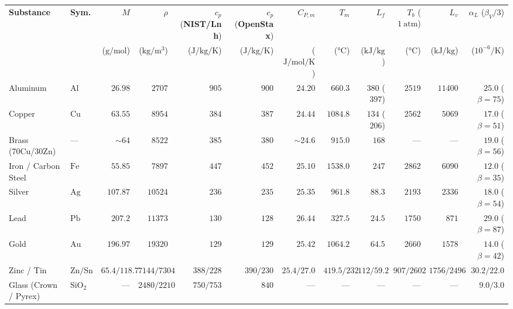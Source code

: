 \documentclass[10pt,twoside,openany,letterpaper]{book}
\begin{document}
\begin{quicksheet}
\begin{formulacard}
\par\smallskip\noindent
\scriptsize\setlength{\tabcolsep}{2.1pt}\renewcommand{\arraystretch}{1.07}
\begin{tabularx}{\linewidth}{@{}X l r r r r r r r r r r@{}}
\toprule
\textbf{Substance} & \textbf{Sym.} & $M$ & $\rho$ & $c_p$ (\textbf{NIST/Lnh}) & $c_p$ (\textbf{OpenStax}) & $C_{P,m}$ & $T_m$ & $L_f$ & $T_b$ ($\SI{1}{\text{atm}}$) & $L_v$ & $\alpha_L$ ($\beta_V/3$) \\
 & & ($\si{\gram\per\mole}$) & ($\si{\kilogram\per\cubic\meter}$) & ($\si{\joule\per\kilogram\per\kelvin}$) & ($\si{\joule\per\kilogram\per\kelvin}$) & ($\si{\joule\per\mole\per\kelvin}$) & ($\si{\celsius}$) & ($\si{\kilo\joule\per\kilogram}$) & ($\si{\celsius}$) & ($\si{\kilo\joule\per\kilogram}$) & ($10^{-6}\si{\per\kelvin}$) \\
\midrule
Aluminum & $\mathrm{Al}$ & $26.98$ & $2707$ & $905$ & $900$ & $24.20$ & $660.3$ & $380$ ($397$) & $2519$ & $11400$ & $25.0$ ($\beta=75$) \\
Copper & $\mathrm{Cu}$ & $63.55$ & $8954$ & $384$ & $387$ & $24.44$ & $1084.8$ & $134$ ($206$) & $2562$ & $5069$ & $17.0$ ($\beta=51$) \\
Brass (70Cu/30Zn) & — & $\sim 64$ & $8522$ & $385$ & $380$ & $\sim 24.6$ & $915.0$ & $168$ & — & — & $19.0$ ($\beta=56$) \\
Iron / Carbon Steel & $\mathrm{Fe}$ & $55.85$ & $7897$ & $447$ & $452$ & $25.10$ & $1538.0$ & $247$ & $2862$ & $6090$ & $12.0$ ($\beta=35$) \\
Silver & $\mathrm{Ag}$ & $107.87$ & $10524$ & $236$ & $235$ & $25.35$ & $961.8$ & $88.3$ & $2193$ & $2336$ & $18.0$ ($\beta=54$) \\
Lead & $\mathrm{Pb}$ & $207.2$ & $11373$ & $130$ & $128$ & $26.44$ & $327.5$ & $24.5$ & $1750$ & $871$ & $29.0$ ($\beta=87$) \\
Gold & $\mathrm{Au}$ & $196.97$ & $19320$ & $129$ & $129$ & $25.42$ & $1064.2$ & $64.5$ & $2660$ & $1578$ & $14.0$ ($\beta=42$) \\
Zinc / Tin & $\mathrm{Zn/Sn}$ & $65.4/118.7$ & $7144/7304$ & $388/228$ & $390/230$ & $25.4/27.0$ & $419.5/232$ & $112/59.2$ & $907/2602$ & $1756/2496$ & $30.2/22.0$ \\
Glass (Crown / Pyrex) & $\mathrm{SiO_2}$ & — & $2480/2210$ & $750/753$ & $840$ & — & — & — & — & — & $9.0 / 3.0$ \\

\end{tabularx}
\end{formulacard}
\end{quicksheet}
\end{document}

